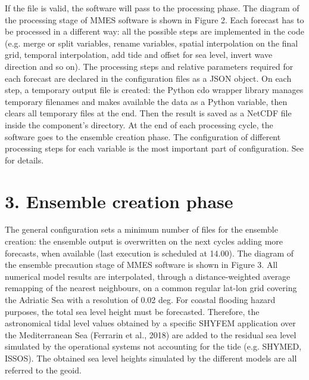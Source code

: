 \documentclass[letterpaper,10pt,english]{sphinxmanual}
\begin{document}
If the file is valid, the software will pass to the processing phase. The diagram of the processing stage of MMES software is shown in Figure 2. Each forecast has to be processed in a different way: all the possible steps are implemented in the code (e.g. merge or split variables, rename variables, spatial interpolation on the final grid, temporal interpolation, add tide and offset for sea level, invert wave direction and so on). The processing steps and relative parameters required for each forecast are declared in the configuration files as a JSON object.
On each step, a temporary output file is created: the Python cdo wrapper library manages temporary filenames and makes available the data as a Python variable, then clears all temporary files at the end. Then the result is saved as a NetCDF file inside the component’s directory. At the end of each processing cycle, the software goes to the ensemble creation phase.
The configuration of different processing steps for each variable is the most important part of configuration. See {\hyperref[\detokenize{configuration/index:proc-config}]{}} for details.


\section{3. Ensemble creation phase}
\label{\detokenize{howitworks/index:ensemble-creation-phase}}\begin{quote}

\begin{figure}[H]
\centering

\noindent{}
\end{figure}
\end{quote}

The general configuration sets a minimum number of files for the ensemble creation: the ensemble output is overwritten on the next cycles adding more forecasts, when available (last execution is scheduled at 14.00). The diagram of the ensemble precaution stage of MMES software is shown in Figure 3.
All numerical model results are interpolated, through a distance-weighted average remapping of the nearest neighbours, on a common regular lat-lon grid covering the Adriatic Sea with a resolution of 0.02 deg.
For coastal flooding hazard purposes, the total sea level height must be forecasted. Therefore, the astronomical tidal level values obtained by a specific SHYFEM application over the Mediterranean Sea (Ferrarin et al., 2018) are added to the residual sea level simulated by the operational systems not accounting for the tide (e.g. SHYMED, ISSOS). The obtained sea level heights simulated by the different models are all referred to the geoid.
\end{document}
